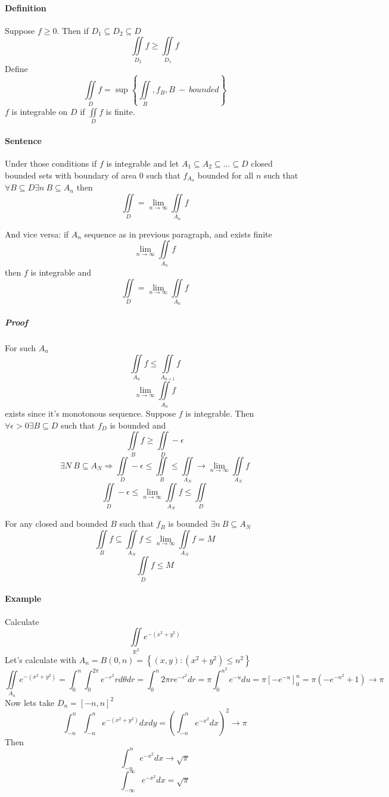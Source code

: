 \paragraph{Definition}
Suppose $f\geq 0$.  Then if $D_1 \subseteq D_2 \subseteq D$
$$\iint\limits_{D_2} f \geq \iint\limits_{D_1} f$$
Define
$$\iint\limits_{D} f = \sup \left\{ \iint\limits_{B}, f_B, B \:- \:bounded \right\}$$
$f$ is integrable on $D$ if
$\iint\limits_{D} f$ is finite.
\paragraph{Sentence}  Under those conditions if $f$ is integrable and let $A_1 \subseteq A_2 \subseteq \dots \subseteq D$ closed bounded sets with boundary of area 0 such that $f_{A_n}$ bounded for all $n$ such that $\forall B \subseteq D \exists n \: B \subseteq A_n$ then
$$\iint\limits_D = \lim_{n \to \infty} \iint\limits_{A_n} f$$

And vice versa: if $A_n$ sequence as in previous paragraph, and exists finite
$$\lim_{n \to \infty} \iint\limits_{A_n} f$$
then $f$  is integrable and
$$\iint\limits_D = \lim_{n \to \infty} \iint\limits_{A_n} f$$
\subparagraph{Proof}
For such $A_n$
$$\iint\limits_{A_n} f \leq \iint\limits_{A_{n+1}} f $$
$$\lim_{n \to \infty} \iint\limits_{A_n} f$$
exists since it's monotonous sequence.
Suppose $f$ is integrable. Then $\forall \epsilon>0 \exists B \subseteq D $ such that $f_D$ is bounded and
$$\iint\limits_{B} f \geq \iint\limits_{D} - \epsilon$$
$$\exists N \: B \subseteq A_N \Rightarrow \iint\limits_{D}  - \epsilon \leq \iint\limits_{B} \leq \iint\limits_{A_N} \to \lim_{n \to \infty} \iint\limits_{A_N} f$$
$$\iint\limits_{D}  - \epsilon \leq \lim_{n \to \infty} \iint\limits_{A_N} f \leq \iint\limits_{D}  $$ 

For any closed and bounded $B$ such that $f_B$ is bounded $\exists n \: B \subseteq A_N$
$$\iint\limits_{B} f \subseteq \iint\limits_{A_N} f \leq \lim_{n \to \infty}\iint\limits_{A_N} f  = M $$
$$\iint\limits_D f \leq M$$
\paragraph{Example}
Calculate
$$\iint\limits_{\mathbb{R}^2} e^{-(x^2+y^2)}$$
Let's calculate with $A_n = B(0,n) = \left\{ (x,y): (x^2+y^2) \leq n^2 \right\}$
$$\iint\limits_{A_n} e^{-(x^2+y^2)} = \int_0^n \int_0^{2\pi} e^{-r^2}r d\theta dr = \int_0^n 2\pi r e^{-r^2} dr = \pi \int_0^{n^2} e^{-u}du = \pi \left[ -e^{-u} \right]_0^n = \pi (-e^{-n^2} + 1) \to \pi$$
Now lets take $D_n = [-n,n]^2$
$$\int_{-n}^{n}\int_{-n}^{n} e^{-(x^2+y^2)}dxdy = \left(\int_{-n}^{n} e^{-x^2}dx\right)^2 \to \pi$$
Then
$$\int_{-n}^{n} e^{-x^2}dx \to \sqrt{\pi}$$
$$\int_{-\infty}^{\infty} e^{-x^2}dx = \sqrt{\pi}$$
